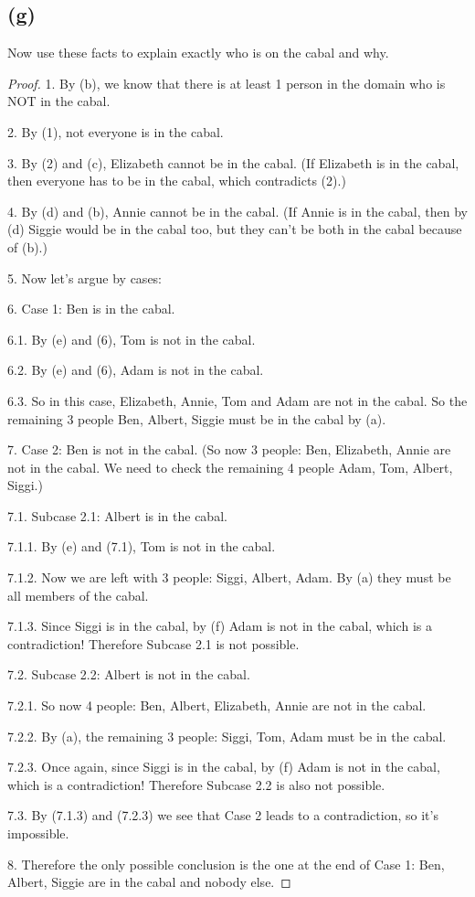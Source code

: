 \documentclass[14pt]{extarticle}
\begin{document}
\subsection{(g)}
Now use these facts to explain exactly who is on the cabal and why.
\begin{proof}
    1. By (b), we know that there is at least 1 person in the domain who is NOT in the cabal.

    2. By (1), not everyone is in the cabal.

    3. By (2) and (c), Elizabeth cannot be in the cabal. (If Elizabeth is in the cabal, then everyone has to be in the cabal, which contradicts (2).)

    4. By (d) and (b), Annie cannot be in the cabal. (If Annie is in the cabal, then by (d) Siggie would be in the cabal too, but they can't be both in the cabal because of (b).)

    5. Now let's argue by cases:

    6. Case 1: Ben is in the cabal.

    6.1. By (e) and (6), Tom is not in the cabal.

    6.2. By (e) and (6), Adam is not in the cabal.

    6.3. So in this case, Elizabeth, Annie, Tom and Adam are not in the cabal. So the remaining 3 people Ben, Albert, Siggie must be in the cabal by (a).

    7. Case 2: Ben is not in the cabal. (So now 3 people: Ben, Elizabeth, Annie are not in the cabal. We need to check the remaining 4 people Adam, Tom, Albert, Siggi.)

    7.1. Subcase 2.1: Albert is in the cabal.

    7.1.1. By (e) and (7.1), Tom is not in the cabal.

    7.1.2. Now we are left with 3 people: Siggi, Albert, Adam. By (a) they must be all members of the cabal.

    7.1.3. Since Siggi is in the cabal, by (f) Adam is not in the cabal, which is a contradiction! Therefore Subcase 2.1 is not possible.

    7.2. Subcase 2.2: Albert is not in the cabal.

    7.2.1. So now 4 people: Ben, Albert, Elizabeth, Annie are not in the cabal.

    7.2.2. By (a), the remaining 3 people: Siggi, Tom, Adam must be in the cabal.

    7.2.3. Once again, since Siggi is in the cabal, by (f) Adam is not in the cabal, which is a contradiction! Therefore Subcase 2.2 is also not possible.

    7.3. By (7.1.3) and (7.2.3) we see that Case 2 leads to a contradiction, so it's impossible.

    8. Therefore the only possible conclusion is the one at the end of Case 1: Ben, Albert, Siggie are in the cabal and nobody else.
\end{proof}
\end{document}
